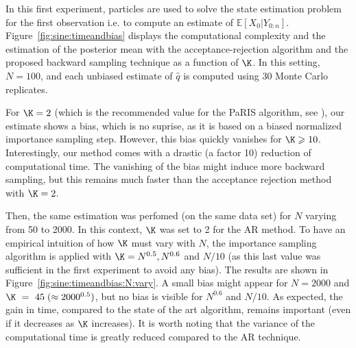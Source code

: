 \documentclass{article}
\newcommand{\N}{N}
\def\pE{\mathbb{E}}
\newcommand{\eqsp}{\;}
\begin{document}
In this first experiment, particles are used to solve the state estimation problem for the first observation i.e. to compute an estimate of $ \pE[ X_{0} | Y_{0:n}]$.
Figure~\ref{fig:sine:timeandbias} displays the computational complexity and the estimation of the posterior mean with the acceptance-rejection algorithm and the proposed backward sampling technique as a function of $\K$. 
In this setting, $N=100$, and each unbiased estimate of $\hat{q}$ is computed using 30 Monte Carlo replicates.

For $\K = 2$ (which is the recommended value for the PaRIS algorithm, see \cite{olsson2017efficient}), our estimate shows a bias, which is no suprise, as it is based on a biased normalized importance sampling step. However, this bias quickly vanishes for $\K \geqslant 10$. 
Interestingly, our method comes with a drastic (a factor 10) reduction of computational time. 
The vanishing of the bias might induce more backward sampling, but this remains much faster than the acceptance rejection method with $\K = 2$.

Then, the same estimation was perfomed (on the same data set) for $\N$ varying from 50 to 2000.
In this context, $\K$ was set to 2 for the AR method. 
To have an empirical intuition of how $\K$ must vary with $\N$, the importance sampling algorithm is applied with $\K = \N^{0.5}, \N^{0.6}$ and $N / 10$ (as this last value was sufficient in the first experiment to avoid any bias). The results are shown in Figure~\ref{fig:sine:timeandbias:N:vary}. A  small bias might appear for $\N = 2000$ and $\K~=~45\eqsp(\approx 2000^{0.5})$, but no bias is visible for $\N^{0.6}$ and $\N /10$. 
As expected, the gain in time, compared to the state of the art algorithm, remains important (even if it decreases as $\K$ increases). 
It is worth noting that the variance of the computational time is greatly reduced compared to the AR technique.%
\end{document}
